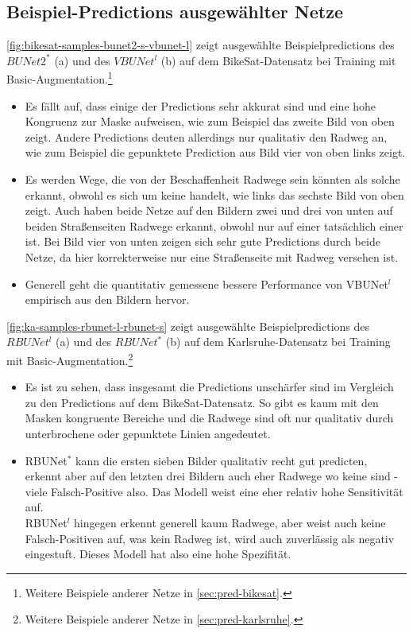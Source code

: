 \subsection{Beispiel-Predictions ausgewählter Netze} \label{sec:example-preds}

\autoref{fig:bikesat-samples-bunet2-s-vbunet-l} zeigt ausgewählte Beispielpredictions des $BUNet2^*$ (a) und 
des $VBUNet^l$ (b) auf dem BikeSat-Datensatz bei Training mit Basic-Augmentation.\footnote{Weitere Beispiele anderer Netze in \autoref{sec:pred-bikesat}.}
\begin{itemize}
	\item Es fällt auf, dass einige der Predictions sehr akkurat sind und eine hohe Kongruenz zur Maske aufweisen,
	wie zum Beispiel das zweite Bild von oben zeigt. Andere Predictions deuten allerdings nur qualitativ den Radweg an, 
	wie zum Beispiel die gepunktete Prediction aus Bild vier von oben links zeigt.
	\item Es werden Wege, die von der Beschaffenheit Radwege sein könnten als solche erkannt, 
	obwohl es sich um keine handelt, wie links das sechste Bild von oben zeigt. Auch haben beide Netze 
	auf den Bildern zwei und drei von unten auf beiden Straßenseiten Radwege erkannt, obwohl nur auf einer tatsächlich einer ist.
	Bei Bild vier von unten zeigen sich sehr gute Predictions durch beide Netze, da hier korrekterweise nur eine Straßenseite 
	mit Radweg versehen ist. 
	\item Generell geht die quantitativ gemessene bessere Performance von VBUNet$^l$ empirisch aus den Bildern hervor.
\end{itemize}

\autoref{fig:ka-samples-rbunet-l-rbunet-s} zeigt ausgewählte Beispielpredictions des $RBUNet^l$ (a) und 
des $RBUNet^*$ (b) auf dem Karlsruhe-Datensatz bei Training mit Basic-Augmentation.\footnote{Weitere Beispiele anderer Netze in \autoref{sec:pred-karlsruhe}.}
\begin{itemize}
	\item Es ist zu sehen, dass insgesamt die Predictions unschärfer sind im Vergleich zu den Predictions auf dem 
	BikeSat-Datensatz. So gibt es kaum mit den Masken kongruente Bereiche und die Radwege sind oft nur 
	qualitativ durch unterbrochene oder gepunktete Linien angedeutet. 
	\item RBUNet$^*$ kann die ersten sieben Bilder qualitativ recht gut predicten, erkennt aber auf den letzten 
	drei Bildern auch eher Radwege wo keine sind - viele Falsch-Positive also. 
	Das Modell weist eine eher relativ hohe Sensitivität auf. \\
	RBUNet$^l$ hingegen erkennt generell kaum Radwege, aber weist auch keine Falsch-Positiven auf, 
	was kein Radweg ist, wird auch zuverlässig als negativ eingestuft. Dieses Modell hat also eine hohe Spezifität.     
\end{itemize}

